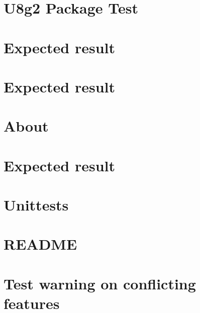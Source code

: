 \documentclass[twoside]{book}
\newcommand{\+}{\discretionary{\mbox{\scriptsize$\hookleftarrow$}}{}{}}
\begin{document}
\chapter{U8g2 Package Test}
\label{md__home_ayush_RIOT_tests_pkg_u8g2_README}

\chapter{Expected result}
\label{md__home_ayush_RIOT_tests_rmutex_README}

\chapter{Expected result}
\label{md__home_ayush_RIOT_tests_saul_README}

\chapter{About}
\label{md__home_ayush_RIOT_tests_sntp_README}

\chapter{Expected result}
\label{md__home_ayush_RIOT_tests_thread_exit_README}

\chapter{Unittests}
\label{md__home_ayush_RIOT_tests_unittests_README}

\chapter{R\+E\+A\+D\+ME}
\label{md__home_ayush_RIOT_tests_unittests_tests-cpp_ctors_README}

\chapter{Test warning on conflicting features}
\label{md__home_ayush_RIOT_tests_warn_conflict_README}

\end{document}
